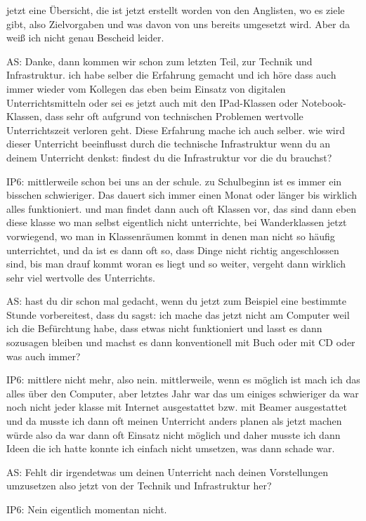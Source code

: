 \documentclass[fontsize=11pt,paper=a4]{scrbook}
\begin{document}
{\begin{itemize*}
jetzt eine Übersicht, die ist jetzt erstellt
worden von den Anglisten, wo es ziele gibt, 
also Zielvorgaben und was davon
von uns bereits umgesetzt wird. Aber da weiß ich nicht genau Bescheid leider.
\item[AS:]Danke, dann kommen wir schon zum letzten Teil, zur Technik und Infrastruktur. 
ich habe selber die Erfahrung gemacht
und ich höre dass auch immer wieder vom
Kollegen das eben beim Einsatz von
digitalen Unterrichtsmitteln oder sei
es jetzt auch mit den IPad-Klassen oder
Notebook-Klassen, dass sehr oft aufgrund von technischen
Problemen wertvolle Unterrichtszeit
verloren geht. Diese Erfahrung mache ich
auch selber. wie wird dieser Unterricht
beeinflusst durch die technische
Infrastruktur wenn du an deinem
Unterricht denkst: findest du die
Infrastruktur vor die du brauchst?
\item[IP6:] mittlerweile schon bei uns an der schule. zu
Schulbeginn ist es immer ein bisschen schwieriger. Das dauert sich immer einen Monat oder
länger bis wirklich alles funktioniert.
und man findet dann auch oft Klassen vor, das sind dann eben diese klasse wo man
selbst eigentlich nicht unterrichte, bei 
Wanderklassen jetzt vorwiegend, wo man in Klassenräumen kommt in denen man nicht so 
häufig unterrichtet,  und da ist es dann oft so, dass Dinge nicht richtig
angeschlossen sind, bis man drauf kommt
woran es liegt und so weiter, vergeht dann
wirklich sehr viel wertvolle des Unterrichts.
\item[AS:] hast du dir 
schon mal gedacht, wenn du jetzt zum
Beispiel eine bestimmte Stunde
vorbereitest, dass du sagst: ich mache das
jetzt nicht am Computer weil ich die
Befürchtung habe, dass etwas nicht
funktioniert und lasst es dann sozusagen
bleiben und machst es dann konventionell mit
Buch oder mit CD oder was auch immer?
\item[IP6:] 
mittlere nicht mehr, also nein.
mittlerweile, wenn es möglich ist mach ich 
das alles über den Computer, aber letztes
Jahr war das um einiges schwieriger da
war noch nicht jeder klasse mit Internet
ausgestattet bzw. mit Beamer ausgestattet und da musste ich dann
oft meinen Unterricht anders planen als
jetzt machen würde
also da war dann oft Einsatz nicht
möglich und daher musste ich dann Ideen
die ich hatte konnte ich einfach nicht
umsetzen, was dann schade war.
\item[AS:] Fehlt dir irgendetwas
 um deinen Unterricht nach deinen Vorstellungen
umzusetzen also jetzt von der Technik und Infrastruktur her?
\item[IP6:] Nein eigentlich momentan nicht.

\end{itemize*}}
\end{document}
